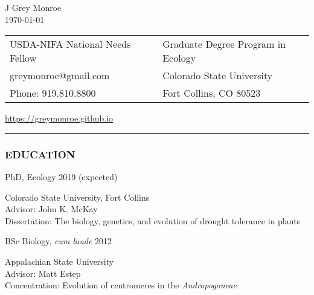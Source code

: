 \documentclass[12pt,english]{article}
\providecommand{\tabularnewline}{\\}
\begin{document}
\begin {center}
{\huge J Grey Monroe}\tabularnewline
\today

\vspace{1em}

\begin{tabular}{>{\raggedright}p{3in}>{\raggedleft}p{3in}}
USDA-NIFA National Needs Fellow & Graduate Degree Program in Ecology\tabularnewline
 greymonroe@gmail.com &  Colorado State University \tabularnewline
Phone: 919.810.8800 & Fort Collins, CO 80523\tabularnewline
\end{tabular}
\href{https://greymonroe.github.io}{https://greymonroe.github.io}
\end{center}
\vspace{-1em}

\rule[0.5ex]{1\columnwidth}{0.5pt}


\subsubsection*{EDUCATION}
\vspace{-0.5ex}

\hspace{1.0em} PhD, Ecology
\hfill 
2019 (expected)
\par
\hspace*{2.0em} Colorado State University, Fort Collins \\
\hspace*{2.0em} Advisor: John K. McKay \\
\hspace*{2.0em} Dissertation: The biology, genetics, and evolution of drought tolerance in plants 
\\
\vspace{-0.5ex}\par

\hspace{1.0em} BSc Biology, \emph{cum laude}  
\hfill
2012
\par
\hspace*{2.0em} Appalachian State University \\
\hspace*{2.0em} Advisor: Matt Estep \\
\hspace*{2.0em} Concentration: Evolution of centromeres in the \textit{Andropogoneae} \\
\end{document}
